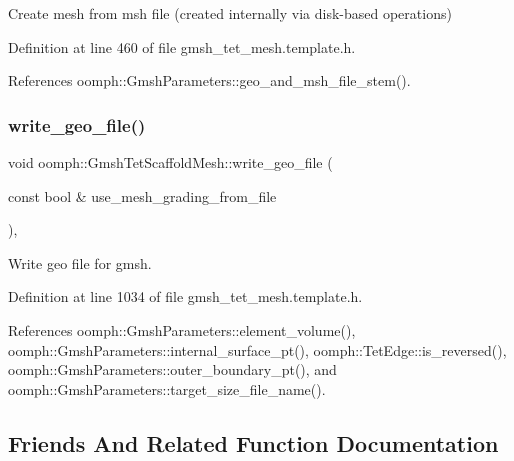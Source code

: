 Create mesh from msh file (created internally via disk-\/based operations) 



Definition at line 460 of file gmsh\+\_\+tet\+\_\+mesh.\+template.\+h.



References oomph\+::\+Gmsh\+Parameters\+::geo\+\_\+and\+\_\+msh\+\_\+file\+\_\+stem().

\mbox{\label{classoomph_1_1GmshTetScaffoldMesh_a20ba8fb06fe0264c4ba0b586b104f969}} 
\subsubsection{\texorpdfstring{write\+\_\+geo\+\_\+file()}{write\_geo\_file()}}
{\footnotesize\ttfamily void oomph\+::\+Gmsh\+Tet\+Scaffold\+Mesh\+::write\+\_\+geo\+\_\+file (\begin{DoxyParamCaption}\item[{const bool \&}]{use\+\_\+mesh\+\_\+grading\+\_\+from\+\_\+file }\end{DoxyParamCaption})\hspace{0.3cm}{\ttfamily [inline]}, {\ttfamily [private]}}



Write geo file for gmsh. 



Definition at line 1034 of file gmsh\+\_\+tet\+\_\+mesh.\+template.\+h.



References oomph\+::\+Gmsh\+Parameters\+::element\+\_\+volume(), oomph\+::\+Gmsh\+Parameters\+::internal\+\_\+surface\+\_\+pt(), oomph\+::\+Tet\+Edge\+::is\+\_\+reversed(), oomph\+::\+Gmsh\+Parameters\+::outer\+\_\+boundary\+\_\+pt(), and oomph\+::\+Gmsh\+Parameters\+::target\+\_\+size\+\_\+file\+\_\+name().



\subsection{Friends And Related Function Documentation}
\mbox{\label{classoomph_1_1GmshTetScaffoldMesh_a542660fc34eb890a935f0d42a3b4eb8a}} 
